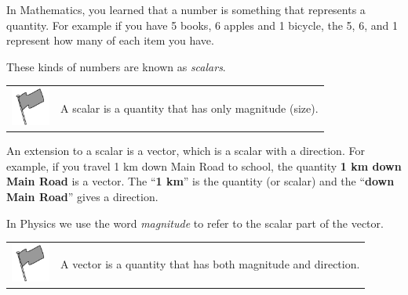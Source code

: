       
      \label{m38812*id186720}In Mathematics, you learned that a number is something that represents a quantity. For example if you have 5 books, 6 apples and 1 bicycle, the 5, 6, and 1 represent how many of each item you have.\par 
      \label{m38812*id186725}These kinds of numbers are known as \textsl{scalars}.\par 
\label{m38812*fhsst!!!underscore!!!id78}\begin{definition}
	  \begin{tabular*}{15 cm}{m{15 mm}m{}}
	\hspace*{-50pt}  \includegraphics[width=0.5in]{col11305.imgs/psflag2.png}   & \Definition{   \label{id2510220}\textbf{ Scalar }} { \label{m38812*meaningfhsst!!!underscore!!!id78}
      \label{m38812*id186740}A scalar is a quantity that has only magnitude (size). \par 
       } 
      \end{tabular*}
      \end{definition}

      \label{m38812*id186750}An extension to a scalar is a vector, which is a scalar with a direction. For example, if you travel 1 km down Main Road to school, the quantity \textbf{1 km down Main Road} is a vector. The ``\textbf{1 km}'' is the quantity (or scalar) and the ``\textbf{down Main Road}'' gives a direction.\par 
      \label{m38812*id186771}In Physics we use the word \textsl{magnitude} to refer to the scalar part of the vector.\par 
\label{m38812*fhsst!!!underscore!!!id83}\begin{definition}
	  \begin{tabular*}{15 cm}{m{15 mm}m{}}
	\hspace*{-50pt}  \includegraphics[width=0.5in]{col11305.imgs/psflag2.png}   & \Definition{   \label{id2510284}\textbf{ Vectors }} { \label{m38812*meaningfhsst!!!underscore!!!id83}
      \label{m38812*id186786}A vector is a quantity that has both magnitude and direction. \par 
       } 
      \end{tabular*}
      \end{definition}

